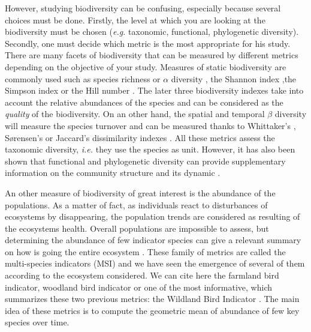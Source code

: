 \documentclass[
  12pt,
  oneside]{report}
\begin{document}
However, studying biodiversity can be confusing, especially because several choices must be done. Firstly, the level at which you are looking at the biodiversity must be chosen (\emph{e.g.} taxonomic, functional, phylogenetic diversity). Secondly, one must decide which metric is the most appropriate for his study. There are many facets of biodiversity that can be measured by different metrics depending on the objective of your study. Measures of static biodiversity are commonly used such as species richness or \(\alpha\) diversity \autocite[\emph{i.e.} number of species,][]{whittaker_vegetation_1960}, the Shannon index \autocite{shannon_mathematical_1948} ,the Simpson index \autocite{simpson_measurement_1949} or the Hill number \autocite{hill_diversity_1973}. The later three biodiversity indexes take into account the relative abundances of the species and can be considered as the \emph{quality} of the biodiversity. On an other hand, the spatial and temporal \(\beta\) diversity will measure the species turnover and can be measured thanks to Whittaker's \autocite{whittaker_evolution_1972}, Sørensen's \autocite{sorensen_method_1948} or Jaccard's \autocite{jaccard_distribution_1912} dissimilarity indexes \autocite[\emph{e.g.}][]{keil_patterns_2012}. All these metrics assess the taxonomic diversity, \emph{i.e.} they use the species as unit. However, it has also been shown that functional and phylogenetic diversity can provide supplementary information on the community structure and its dynamic \autocites[\emph{e.g.}][]{mcgill_rebuilding_2006,mouquet_ecophylogenetics_2012,webb_phylogenies_2002}.

An other measure of biodiversity of great interest is the abundance of the populations. As a matter of fact, as individuals react to disturbances of ecosystems by disappearing, the population trends are considered as resulting of the ecosystems health. Overall populations are impossible to assess, but determining the abundance of few indicator species can give a relevant summary on how is going the entire ecosystem \autocite{gregory_developing_2005}. These family of metrics are called the multi-species indicators (MSI) and we have seen the emergence of several of them according to the ecosystem considered. We can cite here the farmland bird indicator, woodland bird indicator or one of the most informative, which summarizes these two previous metrics: the Wildland Bird Indicator \autocite{gregory_generation_1999,gregory_wild_2010}. The main idea of these metrics is to compute the geometric mean of abundance of few key species over time.
\end{document}
